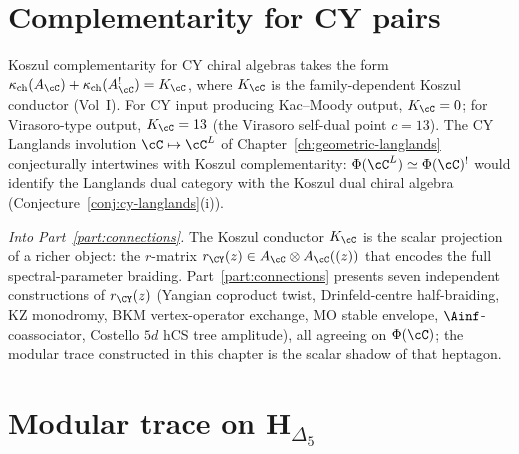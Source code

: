 \section{Complementarity for CY pairs}
\label{sec:cy-complementarity}

Koszul complementarity for CY chiral algebras takes the form $\kappa_{\mathrm{ch}}(A_\cC) + \kappa_{\mathrm{ch}}(A_\cC^!) = K_\cC$, where $K_\cC$ is the family-dependent Koszul conductor (Vol~I). For CY input producing Kac--Moody output, $K_\cC = 0$; for Virasoro-type output, $K_\cC = 13$ (the Virasoro self-dual point $c = 13$). The CY Langlands involution $\cC \mapsto \cC^L$ of Chapter~\ref{ch:geometric-langlands} conjecturally intertwines with Koszul complementarity: $\Phi(\cC^L) \simeq \Phi(\cC)^!$ would identify the Langlands dual category with the Koszul dual chiral algebra (Conjecture~\ref{conj:cy-langlands}(i)).

\smallskip
\noindent\textit{Into Part~\ref{part:connections}.} The Koszul conductor $K_\cC$ is the scalar projection of a richer object: the $r$-matrix $r_{\CY}(z) \in A_\cC \otimes A_\cC((z))$ that encodes the full spectral-parameter braiding. Part~\ref{part:connections} presents seven independent constructions of $r_{\CY}(z)$ (Yangian coproduct twist, Drinfeld-centre half-braiding, KZ monodromy, BKM vertex-operator exchange, MO stable envelope, $\Ainf$-coassociator, Costello $5d$ hCS tree amplitude), all agreeing on $\Phi(\cC)$; the modular trace constructed in this chapter is the scalar shadow of that heptagon.

\section{Modular trace on \texorpdfstring{$\mathbf H_{\Delta_5}$}{H-Delta-5}}
\label{sec:modtr-bkm-shadow}

